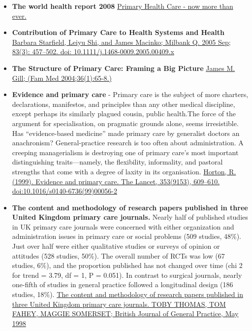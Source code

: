 \documentclass[]{book}
\begin{document}
\begin{itemize}
\item
  \textbf{The world health report 2008} \href{https://www.who.int/whr/2008/whr08_en.pdf}{Primary Health Care - now more than ever.}
\item
  \textbf{Contribution of Primary Care to Health Systems and Health} \href{https://www.ncbi.nlm.nih.gov/pmc/articles/PMC2690145/}{Barbara Starfield, Leiyu Shi, and James Macinko; Milbank Q. 2005 Sep; 83(3): 457--502. doi: 10.1111/j.1468-0009.2005.00409.x}
\item
  \textbf{The Structure of Primary Care: Framing a Big Picture} \href{https://fammedarchives.blob.core.windows.net/imagesandpdfs/fmhub/fm2004/January/James65.pdf}{James M. Gill; (Fam Med 2004;36(1):65-8.)}
\item
  \textbf{Evidence and primary care} - Primary care is the subject of more charters, declarations, manifestos, and principles than any other medical discipline, except perhaps its similarly plagued cousin, public health.The force of the argument for specialisation, on pragmatic grounds alone, seems irresistible. Has ``evidence-based medicine'' made primary care by generalist doctors an anachronism? General-practice research is too often about administration. A creeping managerialism is destroying one of primary care's most important distinguishing traits---namely, the flexibility, informality, and pastoral strengths that come with a degree of laxity in its organisation. \href{https://sci-hub.se/https://doi.org/10.1016/S0140-6736(99)00056-2}{Horton, R. (1999). Evidence and primary care. The Lancet, 353(9153), 609--610. doi:10.1016/s0140-6736(99)00056-2}
\item
  \textbf{The content and methodology of research papers published in three United Kingdom primary care journals.} Nearly half of published studies in UK primary care journals were concerned with either organization and administration issues in primary care or social problems (509 studies, 48\%). Just over half were either qualitative studies or surveys of opinion or attitudes (528 studies, 50\%). The overall number of RCTs was low (67 studies, 6\%), and the proportion published has not changed over time (chi 2 for trend = 3.79, df = 1, P = 0.051). In contrast to surgical journals, nearly one-fifth of studies in general practice followed a longitudinal design (186 studies, 18\%). \href{https://www.ncbi.nlm.nih.gov/pmc/articles/PMC1410169/pdf/brjgenprac00086-0019.pdf}{The content and methodology of research papers published in three United Kingdom primary care journals. TOBY THOMAS, TOM FAHEY, MAGGIE SOMERSET; British Journal of General Practice, May 1998}

\end{itemize}
\end{document}
